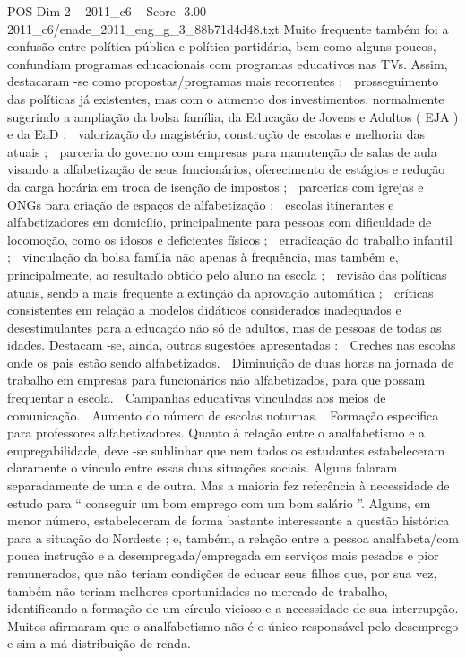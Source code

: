 \begin{textsample}{POS Dim 2 – 2011\_c6 – Score -3.00 – 2011\_c6/enade\_2011\_eng\_g\_3\_88b71d4d48.txt}
Muito frequente também foi a confusão entre política pública e política partidária, bem como alguns poucos, confundiam programas educacionais com programas educativos nas TVs.
Assim, destacaram -se como propostas/programas mais recorrentes :  prosseguimento das políticas já existentes, mas com o aumento dos investimentos, normalmente sugerindo a ampliação da bolsa família, da Educação de Jovens e Adultos ( EJA ) e da EaD ;  valorização do magistério, construção de escolas e melhoria das atuais ;  parceria do governo com empresas para manutenção de salas de aula visando a alfabetização de seus funcionários, oferecimento de estágios e redução da carga horária em troca de isenção de impostos ;  parcerias com igrejas e ONGs para criação de espaços de alfabetização ;  escolas itinerantes e alfabetizadores em domicílio, principalmente para pessoas com dificuldade de locomoção, como os idosos e deficientes físicos ;  erradicação do trabalho infantil ;  vinculação da bolsa família não apenas à frequência, mas também e, principalmente, ao resultado obtido pelo aluno na escola ;  revisão das políticas atuais, sendo a mais frequente a extinção da aprovação automática ;  críticas consistentes em relação a modelos didáticos considerados inadequados e desestimulantes para a educação não só de adultos, mas de pessoas de todas as idades.
Destacam -se, ainda, outras sugestões apresentadas :  Creches nas escolas onde os pais estão sendo alfabetizados.  Diminuição de duas horas na jornada de trabalho em empresas para funcionários não alfabetizados, para que possam frequentar a escola.  Campanhas educativas vinculadas aos meios de comunicação.  Aumento do número de escolas noturnas.  Formação específica para professores alfabetizadores.
Quanto à relação entre o analfabetismo e a empregabilidade, deve -se sublinhar que nem todos os estudantes estabeleceram claramente o vínculo entre essas duas situações sociais.
Alguns falaram separadamente de uma e de outra.
Mas a maioria fez referência à necessidade de estudo para “ conseguir um bom emprego com um bom salário ”.
Alguns, em menor número, estabeleceram de forma bastante interessante a questão histórica para a situação do Nordeste ; e, também, a relação entre a pessoa analfabeta/com pouca instrução e a desempregada/empregada em serviços mais pesados e pior remunerados, que não teriam condições de educar seus filhos que, por sua vez, também não teriam melhores oportunidades no mercado de trabalho, identificando a formação de um círculo vicioso e a necessidade de sua interrupção.
Muitos afirmaram que o analfabetismo não é o único responsável pelo desemprego e sim a má distribuição de renda.

\end{textsample}
